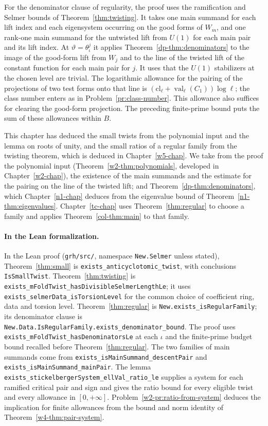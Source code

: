 \documentclass[reqno]{amsart}
\newcounter{chap}
\theoremstyle{definition}
\theoremstyle{plain}
\newcommand{\val}{\operatorname{val}}
\newcommand{\cl}{\mathrm{cl}}
\begin{document}
For the denominator clause of regularity, the proof uses the ramification and Selmer bounds of Theorem~\ref{thm:twisting}.  It takes one main summand for each lift index and each eigensystem occurring on the good forms of \(W_m\), and one rank-one main summand for the untwisted lift from \(U(1)\) for each main pair and its lift index.  At \(\vartheta = \theta_\iota^j\) it applies Theorem~\ref{dp-thm:denominators} to the image of the good-form lift from \(W_j\) and to the line of the twisted lift of the constant function for each main pair for \(j\).  It uses that the \(U(1)\) stabilizers at the chosen level are trivial.  The logarithmic allowance for the pairing of the projections of two test forms onto that line is \((\cl_\ell + \val_\ell(C_1))\log\ell\); the class number enters as in Problem~\ref{pr:class-number}.  This allowance also suffices for clearing the good-form projection.  The preceding finite-prime bound puts the sum of these allowances within \(B\).

This chapter has deduced the small twists from the polynomial input and the lemma on roots of unity, and the small ratios of a regular family from the twisting theorem, which is deduced in Chapter~\ref{w5-chap}.  We take from the proof the polynomial input (Theorem~\ref{w2-thm:polynomials}, developed in Chapter~\ref{w2-chap}), the existence of the main summands and the estimate for the pairing on the line of the twisted lift; and Theorem~\ref{dp-thm:denominators}, which Chapter~\ref{n1-chap} deduces from the eigenvalue bound of Theorem~\ref{n1-thm:eigenvalues}.  Chapter~\ref{tc-chap} uses Theorem~\ref{thm:regular} to choose a family and applies Theorem~\ref{col-thm:main} to that family.

\paragraph{In the Lean formalization.}
In the Lean proof \cite{GL} (\nolinkurl{grh/src/}, namespace \texttt{New.Selmer} unless stated), Theorem~\ref{thm:small} is \texttt{exists\_anticyclotomic\_twist}, with conclusions \texttt{IsSmallTwist}.  Theorem~\ref{thm:twisting} is \texttt{exists\_mFoldTwist\_hasDivisibleSelmerLengthLe}; it uses \texttt{exists\_selmerData\_isTorsionLevel} for the common choice of coefficient ring, data and torsion level.  Theorem~\ref{thm:regular} is \texttt{New.exists\_isRegularFamily}; its denominator clause is \texttt{New.Data.IsRegularFamily.exists\_denominator\_bound}.  The proof uses \texttt{exists\_mFoldTwist\_hasDenominatorsLe} at each \(\iota\) and the finite-prime budget bound recalled before Theorem~\ref{thm:regular}.  The two families of main summands come from \texttt{exists\_isMainSummand\_descentPair} and \texttt{exists\_isMainSummand\_mainPair}.  The lemma \texttt{exists\_stickelbergerSystem\_ellVal\_ratio\_le} supplies a system for each ramified critical pair and sign and gives the ratio bound for every eligible twist and every allowance in \([0,+\infty]\).  Problem~\ref{w2-pr:ratio-from-system} deduces the implication for finite allowances from the bound and norm identity of Theorem~\ref{w4-thm:pair-system}.
\end{document}
